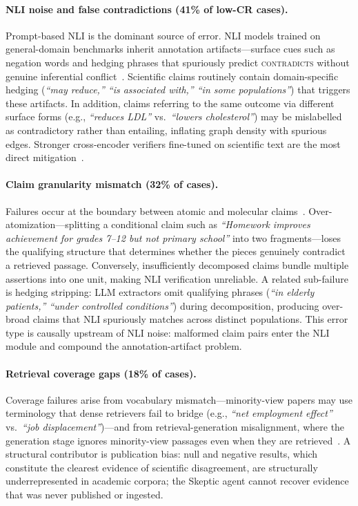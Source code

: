 \documentclass[11pt]{article}
\begin{document}
\paragraph{NLI noise and false contradictions (41\% of low-CR cases).}
Prompt-based NLI is the dominant source of error.
NLI models trained on general-domain benchmarks inherit annotation
artifacts---surface cues such as negation words and hedging phrases that
spuriously predict \textsc{contradicts} without genuine inferential
conflict~\citep{gururangan2018annotation}.  Scientific claims routinely
contain domain-specific hedging (\textit{``may reduce,'' ``is associated with,''
``in some populations''}) that triggers these artifacts.
In addition, claims referring to the same outcome via different surface forms
(e.g., \textit{``reduces LDL''} vs.\ \textit{``lowers cholesterol''}) may be
mislabelled as contradictory rather than entailing, inflating graph density
with spurious edges.  Stronger cross-encoder verifiers fine-tuned on scientific
text are the most direct mitigation~\citep{wadden2020scifact}.

\paragraph{Claim granularity mismatch (32\% of cases).}
Failures occur at the boundary between atomic and molecular
claims~\citep{min2024molecular}.  Over-atomization---splitting a conditional
claim such as \textit{``Homework improves achievement for grades 7--12 but not
primary school''} into two fragments---loses the qualifying structure that
determines whether the pieces genuinely contradict a retrieved passage.
Conversely, insufficiently decomposed claims bundle multiple assertions into one
unit, making NLI verification unreliable.  A related sub-failure is hedging
stripping: LLM extractors omit qualifying phrases (\textit{``in elderly
patients,'' ``under controlled conditions''}) during decomposition, producing
over-broad claims that NLI spuriously matches across distinct populations.
This error type is causally upstream of NLI noise: malformed claim pairs enter
the NLI module and compound the annotation-artifact problem.

\paragraph{Retrieval coverage gaps (18\% of cases).}
Coverage failures arise from vocabulary mismatch---minority-view papers may
use terminology that dense retrievers fail to bridge (e.g., \textit{``net
employment effect''} vs.\ \textit{``job displacement''})---and from
retrieval-generation misalignment, where the generation stage ignores
minority-view passages even when they are retrieved~\citep{ru2024ragchecker}.
A structural contributor is publication bias: null and negative results, which
constitute the clearest evidence of scientific disagreement, are
structurally underrepresented in academic corpora; the Skeptic agent cannot
recover evidence that was never published or ingested.
\end{document}
